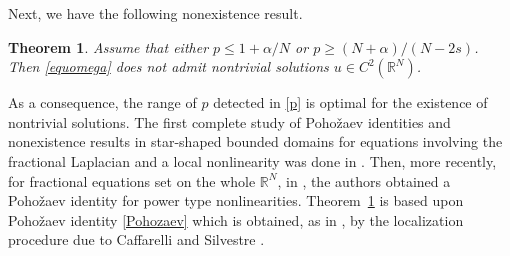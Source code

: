 \documentclass[10pt]{amsart}
\numberwithin{equation}{section}
\newtheorem{theorem}{Theorem}[section]
\begin{document}
\noindent
Next, we have the following nonexistence result.

\begin{theorem}
\label{pohoz-cons-1}
Assume that either $p\leq 1+\alpha/N$ or $p\geq(N+\alpha)/(N-2s)$. Then \eqref{equomega} does not admit 
nontrivial solutions $u \in C^2({{\mathbb R}}^N)$. 
\end{theorem}

\noindent
As a consequence, the range of $p$ detected in \eqref{p} is optimal for the existence of nontrivial solutions.
The first complete study of Poho\v zaev identities and nonexistence results in star-shaped bounded domains
for equations involving the fractional Laplacian and a local nonlinearity was done in \cite{rosoton,rosoton-2}.
Then, more recently, for fractional equations set on the whole ${{\mathbb R}}^N$, in \cite{ChangWang}, the authors obtained
a Poho\v zaev identity for power type nonlinearities. Theorem~\ref{pohoz-cons-1} is based upon Poho\v zaev identity
\eqref{Pohozaev} which is obtained, as in \cite{ChangWang}, by the localization procedure due to Caffarelli and Silvestre \cite{CS}.
\end{document}

